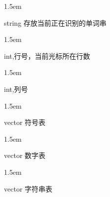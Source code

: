 \documentclass{article}
\begin{document}
\begin{mddefinitions}
\begin{mdbmarginx}{}{}{}{1.5em}%
\begin{mddefdata}%
string 存放当前正在识别的单词串
\end{mddefdata}%
\end{mdbmarginx}%


\begin{mdbmarginx}{}{}{}{1.5em}%
\begin{mddefdata}%
int,行号，当前光标所在行数
\end{mddefdata}%
\end{mdbmarginx}%


\begin{mdbmarginx}{}{}{}{1.5em}%
\begin{mddefdata}%
int,列号
\end{mddefdata}%
\end{mdbmarginx}%


\begin{mdbmarginx}{}{}{}{1.5em}%
\begin{mddefdata}%
vector 符号表
\end{mddefdata}%
\end{mdbmarginx}%


\begin{mdbmarginx}{}{}{}{1.5em}%
\begin{mddefdata}%
vector 数字表
\end{mddefdata}%
\end{mdbmarginx}%


\begin{mdbmarginx}{}{}{}{1.5em}%
\begin{mddefdata}%
vector 字符串表
\end{mddefdata}%
\end{mdbmarginx}%


\end{mddefinitions}
\end{document}
